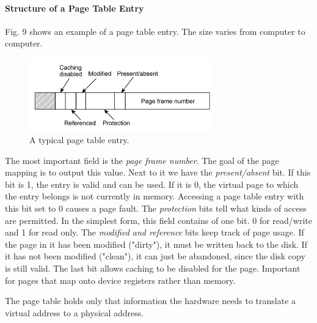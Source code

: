 \documentclass[11pt,a4paper]{article}
\begin{document}
\paragraph{Structure of a Page Table Entry}
Fig. 9 shows an example of a page table entry. The size varies from computer to computer.

\begin{figure}[h!]
	\centering
		\includegraphics[width=300px]{img/entry-01.png}
	\caption{A typical page table entry.}
\end{figure}

The most important field is the \textit{page frame number}. The goal of the page mapping is to output this value. Next to it we have the \textit{present/absent} bit. If this bit is 1, the entry is valid and can be used. If it is 0, the virtual page to which the entry belongs is not currently in memory. Accessing a page table entry with this bit set to 0 causes a page fault.
The \textit{protection} bits tell what kinds of access are permitted. In the simplest form, this field contains of one bit. 0 for read/write and 1 for read only. The \textit{modified and reference} bits keep track of page usage. If the page in it has been modified ("dirty"), it must be written back to the disk. If it has not been modified ("clean"), it can just be abandoned, since the disk copy is still valid. The last bit allows caching to be disabled for the page. Important for pages that map onto device registers rather than memory.

The page table holds only that information the hardware needs to translate a virtual address to a physical address.
\end{document}
